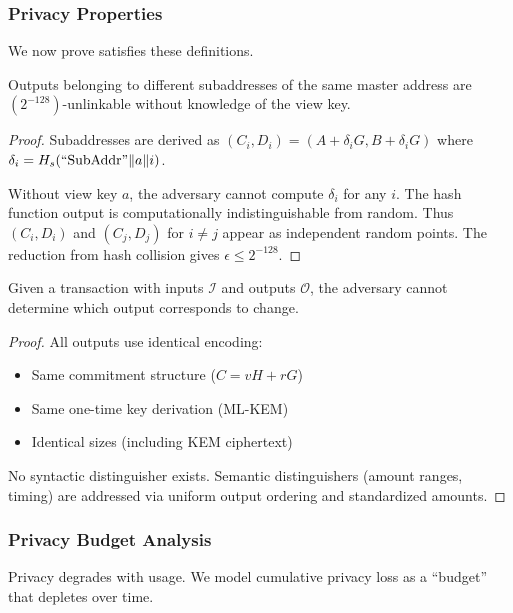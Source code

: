 \subsubsection{\Botho Privacy Properties}

We now prove \Botho satisfies these definitions.

\begin{theorem}
Outputs belonging to different subaddresses of the same master address are
$(2^{-128})$-unlinkable without knowledge of the view key.
\end{theorem}

\begin{proof}
Subaddresses are derived as $(C_i, D_i) = (A + \delta_i G, B + \delta_i G)$
where $\delta_i = H_s(\text{``SubAddr''} \| a \| i)$.

Without view key $a$, the adversary cannot compute $\delta_i$ for any $i$.
The hash function output is computationally indistinguishable from random.
Thus $(C_i, D_i)$ and $(C_j, D_j)$ for $i \neq j$ appear as independent
random points. The reduction from hash collision gives $\epsilon \leq 2^{-128}$.
\end{proof}

\begin{theorem}
Given a transaction with inputs $\mathcal{I}$ and outputs $\mathcal{O}$, the
adversary cannot determine which output corresponds to change.
\end{theorem}

\begin{proof}
All outputs use identical encoding:
\begin{itemize}
  \item Same commitment structure ($C = vH + rG$)
  \item Same one-time key derivation (ML-KEM)
  \item Identical sizes (including KEM ciphertext)
\end{itemize}
No syntactic distinguisher exists. Semantic distinguishers (amount ranges,
timing) are addressed via uniform output ordering and standardized amounts.
\end{proof}

\subsubsection{Privacy Budget Analysis}

Privacy degrades with usage. We model cumulative privacy loss as a ``budget''
that depletes over time.

